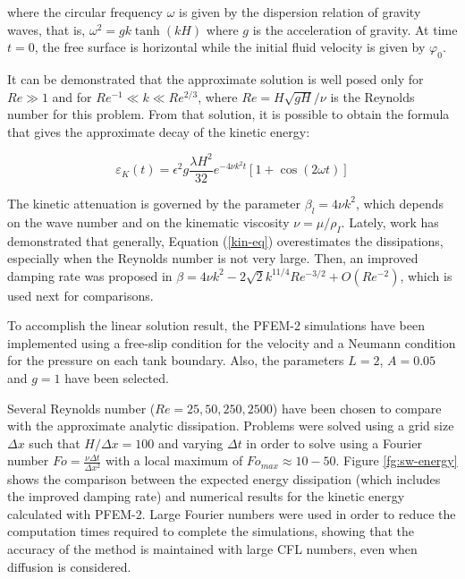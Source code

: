 where the circular frequency $\omega$ is given by the dispersion relation of gravity waves, that is, $\omega^2 = g k \tanh(kH)$ where $g$ is the acceleration of gravity. At time $t = 0$, the free surface is horizontal while the initial fluid velocity is given by $\varphi_0$.

It can be demonstrated that the approximate solution is well posed only for $Re\gg1$ and for $Re^{-1}\ll k \ll Re^{2/3}$, where $Re=H\sqrt{gH}/\nu$ is the Reynolds number for this problem. From that solution, it is possible to obtain the formula that gives the approximate decay of the kinetic energy\cite{Lighthill01}:

\begin{equation}
 \varepsilon_K(t) = \epsilon^2g\frac{\lambda H^2}{32}e^{-4\nu k^2t}\left[1+\cos(2\omega t)\right]
 \label{kin-eq}
\end{equation}

The kinetic attenuation is governed by the parameter $\beta_l = 4\nu k^2$, which depends on the wave number and on the kinematic viscosity $\nu = \mu/\rho_{I}$. Lately, work\cite{Antuono13} has demonstrated that generally, Equation (\ref{kin-eq}) overestimates the dissipations, especially when the Reynolds number is not very large. Then, an improved damping rate was proposed in \cite{Antuono13} $\beta = 4\nu k^2 -  2\sqrt{2}k^{11/4}Re^{-3/2}+O(Re^{-2})$, which is used next for comparisons.

To accomplish the linear solution result, the PFEM-2 simulations have been implemented using a free-slip condition for the velocity and a Neumann condition for the pressure on each tank boundary. Also, the parameters $L=2$, $A=0.05$ and $g=1$ have been selected.

Several Reynolds number ($Re=25,50,250,2500$) have been chosen to compare with the approximate analytic dissipation. Problems were solved using a grid size $\Delta x$ such that $H/\Delta x=100$ and varying $\Delta t$ in order to solve using a Fourier number $Fo=\frac{\nu\Delta t}{\Delta x^2}$ with a local maximum of $Fo_{max}\approx10-50$. Figure \ref{fg:sw-energy} shows the comparison between the expected energy dissipation (which includes the improved damping rate) and numerical results for the kinetic energy calculated with PFEM-2. Large Fourier numbers were used in order to reduce the computation times required to complete the simulations, showing that the accuracy of the method is maintained with large CFL numbers, even when diffusion is considered.

